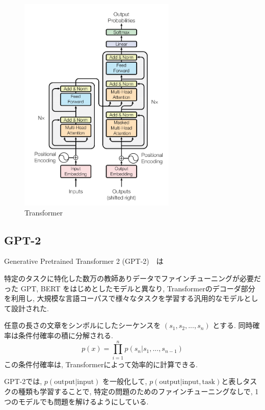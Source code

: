 \documentclass[twocolumn]{jarticle}     %
\begin{document}
\begin{figure}[tb]
  \begin{center}
    \includegraphics[clip,width=75mm]{Transformer.png}
    \caption{Transformer}
    \label{fig:trans}
  \end{center}
\end{figure}



\subsection{GPT-2}
Generative Pretrained Transformer 2 (GPT-2)\cite{radford2019language}　は

特定のタスクに特化した数万の教師ありデータでファインチューニングが必要だった GPT, BERT をはじめとしたモデルと異なり,
Transformerのデコーダ部分を利用し,
大規模な言語コーパスで様々なタスクを学習する汎用的なモデルとして設計された.

任意の長さの文章をシンボルにしたシーケンスを $(s_1, s_2, ..., s_n)$ とする.
同時確率は条件付確率の積に分解される.
\begin{equation}
p(x) = \prod^n_{i=1} p(s_n|s_1, ... , s_{n-1})
\end{equation}
この条件付確率は, Transformer\cite{DBLP:journals/corr/VaswaniSPUJGKP17}によって効率的に計算できる.

GPT-2では, $p(\mathrm{output} | \mathrm{input})$ を一般化して,
$p(\mathrm{output} | \mathrm{input}, \mathrm{task})$と表しタスクの種類も学習することで, 特定の問題のためのファインチューニングなしで, 1つのモデルでも問題を解けるようにしている.
\end{document}
